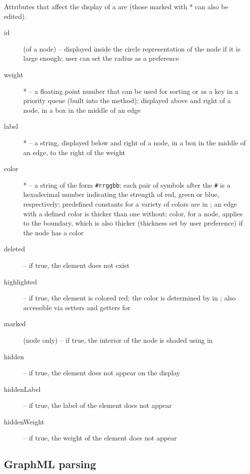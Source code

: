 Attributes that affect the display of a  are (those marked
with * can also be edited).
\begin{description}
  \item[id] (of a node) -- displayed inside the circle representation of the
    node if it is large enough; user can set the radius as a preference
  \item[weight]* -- a floating point number that can be used for sorting or
    as a key in a priority queue (built into the  method);
    displayed above and right of a node, in a box in the middle of an edge
  \item[label]* -- a string, displayed below and right of a node, in a box in
    the middle of an edge, to the right of the weight
  \item[color]* -- a string of the form \texttt{\#rrggbb}; each pair of
    symbols after the \texttt{\#} is a hexadecimal number indicating the
    strength of red, green or blue, respectively; predefined constants for a
    variety of colors are in ; an edge with a defined color
    is thicker than one without; color, for a node, applies to the boundary,
    which is also thicker (thickness set by user preference) if the node has
    a color
  \item[deleted] -- if true, the element does not exist
  \item[highlighted] -- if true, the element is colored red; the color is
    determined by  in
    ; also accessible via
    setters and getters for 
  \item[marked] (node only) -- if true, the interior of the node is shaded
    using  in 
  \item[hidden] -- if true, the element does not appear on the display
  \item[hiddenLabel] -- if true, the label of the element does not appear
  \item[hiddenWeight] -- if true, the weight of the element does not appear
\end{description}

\subsection{GraphML parsing}

